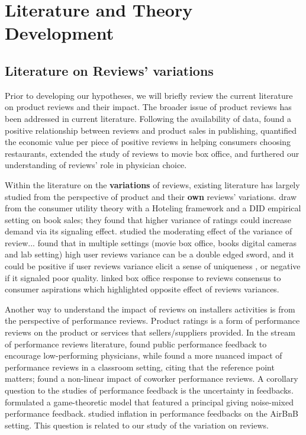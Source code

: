 \section{Literature and Theory Development }
 
\subsection{Literature on Reviews' variations    }
Prior to developing our hypotheses, we will briefly review the current literature on product reviews and their impact.  
The broader issue of product reviews has been addressed in current literature. Following the availability of data,  \cite{chevalier2006effect} found a positive relationship between reviews and product sales in publishing, \cite{wu2015economic} quantified the economic value per piece of positive reviews in helping consumers choosing restaurants, \cite{chintagunta2010effects} extended the study of reviews to movie box office, and \cite{xu2016interplay} furthered our understanding of reviews' role in physician choice. 

Within the literature on the \textbf{variations} of reviews, existing literature has largely studied from the perspective of product and their \textbf{own} reviews' variations. \cite{sun2012does} draw from the consumer utility theory with a Hoteling framework and a DID empirical setting on book sales; they found that higher variance of ratings could increase demand via its signaling effect. \cite{yi2019leveraging} studied the moderating effect of the variance of review... \cite{wang2015user} found that in multiple settings (movie box office, books  digital cameras and lab setting) high user reviews variance can be a double edged sword, and it could be positive if user reviews variance elicit a sense of uniqueness , or negative if it signaled poor quality. \cite{west1998integrating} linked box office response to reviews consensus to consumer aspirations which highlighted opposite effect of reviews variances.  

Another way to understand the impact of reviews on installers activities is from the perspective of performance reviews.  Product ratings is a form of performance reviews on the product or services that sellers/suppliers provided. In the stream of performance reviews literature, \cite{song2017closing} found public performance feedback to encourage low-performing physicians, while \cite{eyring2018performance} found a more nuanced impact of performance reviews in a classroom setting, citing that the reference point matters;  \cite{tan2019you} found a non-linear impact of coworker performance reviews. 
A corollary question to the studies of performance feedback is the uncertainty in feedbacks. \cite{marinovic2015credibility} formulated a game-theoretic model that featured a principal giving noise-mixed performance feedback. \cite{bolton2019inflated} studied inflation in performance feedbacks on the AirBnB setting. This question is related to our study of the variation on reviews. 